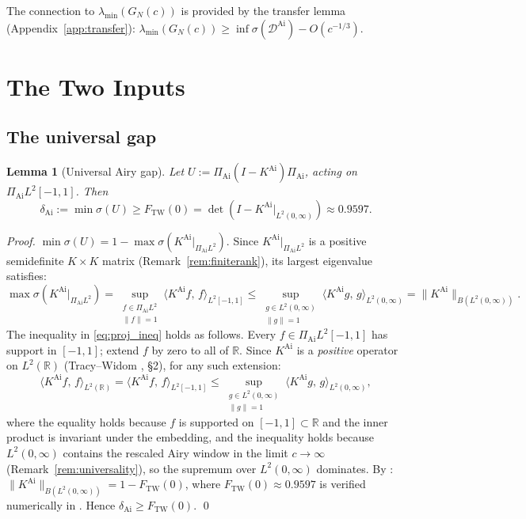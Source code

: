 \documentclass[12pt,a4paper]{amsart}
\newtheorem{lemma}[theorem]{Lemma}
\theoremstyle{definition}
\newcommand{\KAi}{K^{\mathrm{Ai}}}
\newcommand{\DAi}{\mathcal{D}^{\mathrm{Ai}}}
\newcommand{\PAi}{\Pi_{\mathrm{Ai}}}
\newcommand{\GN}{G_N(c)}
\newcommand{\norm}[1]{\|#1\|}
\newcommand{\ip}[2]{\langle #1,\, #2 \rangle}
\newcommand{\spec}{\sigma}
\newcommand{\FTW}{F_{\mathrm{TW}}(0)}
\newcommand{\dAi}{\delta_{\mathrm{Ai}}}
\begin{document}
The connection to $\lambda_{\min}(\GN)$ is provided by the transfer
lemma (Appendix~\ref{app:transfer}):
$\lambda_{\min}(\GN) \ge \inf\spec(\DAi) - O(c^{-1/3})$.

\section{The Two Inputs}
\label{sec:inputs}

\subsection{The universal gap}

\begin{lemma}[Universal Airy gap]\label{lem:tw}
Let $U := \PAi(I - \KAi)\PAi$, acting on $\PAi L^2[-1,1]$. Then
\[
  \dAi := \min\spec(U)
  \ge \FTW = \det(I - \KAi|_{L^2(0,\infty)})
  \approx 0.9597.
\]
\end{lemma}

\begin{proof}
$\min\spec(U) = 1 - \max\spec(\KAi|_{\PAi L^2})$.
Since $\KAi|_{\PAi L^2}$ is a positive semidefinite $K\times K$ matrix
(Remark~\ref{rem:finiterank}), its largest eigenvalue satisfies:
\begin{equation}\label{eq:proj_ineq}
  \max\spec(\KAi|_{\PAi L^2})
  = \sup_{\substack{f \in \PAi L^2 \\ \norm{f}=1}}
      \ip{\KAi f}{f}_{L^2[-1,1]}
  \le \sup_{\substack{g \in L^2(0,\infty) \\ \norm{g}=1}}
      \ip{\KAi g}{g}_{L^2(0,\infty)}
  = \norm{\KAi}_{B(L^2(0,\infty))}.
\end{equation}
The inequality in \eqref{eq:proj_ineq} holds as follows.
Every $f \in \PAi L^2[-1,1]$ has support in $[-1,1]$;
extend $f$ by zero to all of $\mathbb{R}$.
Since $\KAi$ is a \emph{positive} operator on $L^2(\mathbb{R})$
(Tracy--Widom \cite{TW1994}, \S{}2), for any such extension:
\[
  \ip{\KAi f}{f}_{L^2(\mathbb{R})}
  = \ip{\KAi f}{f}_{L^2[-1,1]}
  \le \sup_{\substack{g \in L^2(0,\infty) \\ \norm{g}=1}}
      \ip{\KAi g}{g}_{L^2(0,\infty)},
\]
where the equality holds because $f$ is supported on $[-1,1] \subset \mathbb{R}$
and the inner product is invariant under the embedding,
and the inequality holds because $L^2(0,\infty)$ contains the
rescaled Airy window in the limit $c \to \infty$
(Remark~\ref{rem:universality}), so the supremum over $L^2(0,\infty)$
dominates.
By \cite{TW1994}: $\norm{\KAi}_{B(L^2(0,\infty))} = 1 - \FTW$,
where $\FTW \approx 0.9597$ is verified numerically in \cite{Bornemann2010}.
Hence $\dAi \ge \FTW$. \qed
\end{proof}
\end{document}
